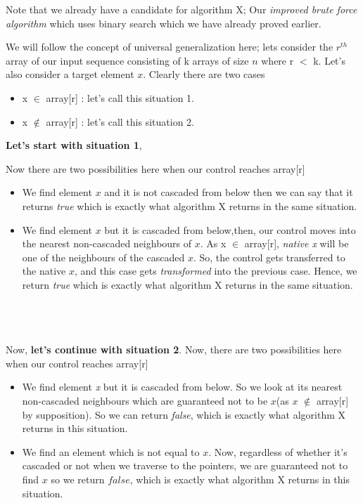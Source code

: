 \documentclass[11pt]{article}
\begin{document}
Note that we already have a candidate for algorithm X; Our \textit{improved brute force algorithm} which uses binary search which we have already proved earlier.


We will follow the concept of universal generalization here; lets consider the $r^{th}$ array of our input sequence consisting of k arrays of size $n$ where r $<$ k. Let's also consider a target element $x$. Clearly there are two cases
\begin{itemize}
    \item x $\in$ array[r] : let's call this situation 1.
     \item x $\notin$ array[r] : let's call this situation 2.
\end{itemize}

\textbf{Let's start with situation 1}, 

Now there are two possibilities here when our control reaches array[r] 
\begin{itemize}
    \item We find element $x$ and it is not cascaded from below then we can say that it returns \textit{true} which is exactly what algorithm X returns in the same situation.
    \item We find element $x$ but it is cascaded from below,then, our control moves into the nearest non-cascaded neighbours of $x$. As x $\in$ array[r], \textit{native x} will be one of the neighbours of the cascaded $x$. So, the control gets transferred to the native $x$, and this case gets \textit{transformed} into the previous case. Hence, we return \textit{true} which is exactly what algorithm X returns in the same situation.
\end{itemize} \\ \\ \\
Now, \textbf{let's continue with situation 2}.
Now, there are two possibilities here when our control reaches array[r] 

\begin{itemize}
    \item We find element \textit{x} but it is cascaded from below. So we look at its nearest non-cascaded neighbours which are guaranteed not to be $x$(as $x$ $\notin$ array[r] by supposition). So we can return \textit{false}, which is exactly what algorithm X returns in this situation.
    \item We find an element which is not equal to $x$. Now, regardless of whether it's cascaded or not when we traverse to the pointers, we are guaranteed not to find $x$ so we return $false$, which is exactly what algorithm X returns in this situation.
\end{itemize}
\end{document}
